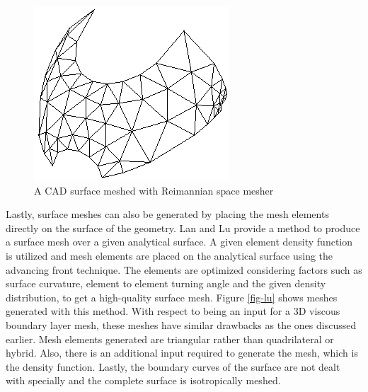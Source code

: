 \begin{figure}
	\centering
	\begin{minipage}{0.45\linewidth}
		\centering
		\includegraphics[width=\linewidth]{img/intro/lit/joseph.png}
		\caption{A CAD surface meshed with Reimannian space mesher}
		\label{fig-joseph}
	\end{minipage}
\end{figure}


Lastly, surface meshes can also be generated by placing the mesh elements directly on the surface of the geometry. Lan and Lu \cite{lan1996finite} provide a method to produce a surface mesh over a given analytical surface. A given element density function is utilized and mesh elements are placed on the analytical surface using the advancing front technique. The elements are optimized considering factors such as surface curvature, element to element turning angle and the given density distribution, to get a high-quality surface mesh. Figure \ref{fig-lu} shows meshes generated with this method. With respect to being an input for a 3D viscous boundary layer mesh, these meshes have similar drawbacks as the ones discussed earlier. Mesh elements generated are triangular rather than quadrilateral or hybrid. Also, there is an additional input required to generate the mesh, which is the density function. Lastly, the boundary curves of the surface are not dealt with specially and the complete surface is isotropically meshed.

